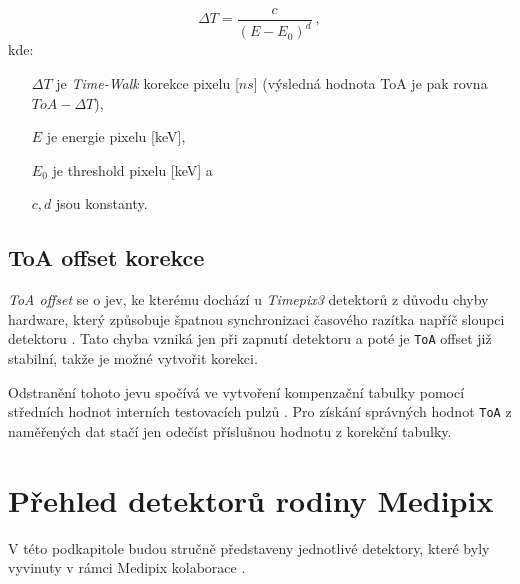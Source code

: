 \begin{equation}\label{eq:det:timeWalk}
	\Delta T = \frac{c}{(E - E_0)^d}~,
\end{equation}
kde:
\begin{changemargin}{1.5cm}{1cm} 
	\begin{itemize}
		\item [$\Delta T$] je \textit{Time-Walk} korekce pixelu [$ns$] (výsledná hodnota ToA je pak rovna $ToA-\Delta T$),
		\item [$E$] je energie pixelu [keV],
		\item [$E_0$] je threshold pixelu [keV] a
		\item [$c,d$] jsou konstanty.
	\end{itemize}
\end{changemargin}

\subsection{ToA offset korekce}\label{chap:detectors:calibration:toa_correction}
\textit{ToA offset} se o jev, ke kterému dochází u \textit{Timepix3} detektorů z důvodu chyby hardware, který způsobuje špatnou synchronizaci časového razítka napříč sloupci detektoru \cite{Katherine}. Tato chyba vzniká jen při zapnutí detektoru a poté je \texttt{ToA} offset již stabilní, takže je možné vytvořit korekci.

Odstranění tohoto jevu spočívá ve vytvoření kompenzační tabulky pomocí středních hodnot interních testovacích pulzů \cite{timepix3}. Pro získání správných hodnot \texttt{ToA} z naměřených dat stačí jen odečíst příslušnou hodnotu z korekční tabulky.

\section{Přehled detektorů rodiny Medipix}\label{chap:detectors:medipix_overview}
V této podkapitole budou stručně představeny jednotlivé detektory, které byly vyvinuty v rámci Medipix kolaborace \cite{medipix-www}.

